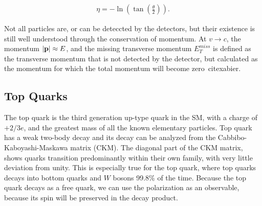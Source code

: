 \documentclass[12pt,a4paper]{article}
\numberwithin{equation}{section}
\begin{document}
\begin{align}
\label{eq:pseudorapidity}
\eta = -\ln({\tan\left(\frac{\theta}{2}\right)}).
\end{align}

Not all particles are, or can be deteccted by the detectors, but their existence
is still well understood through the conservation of momentum. At $v \rightarrow c$, the
momentum $\abs{\vb p} \approx E$, and the missing transverse momentum $E_T^{miss}$ is
defined as the transverse momentum that is not detected by the detector, but
calculated as the momentum for which the total momentum will become
zero~cite{xabier}.

\subsection{Top Quarks}
The top quark is the third generation up-type quark in the SM, with a charge of
$+2/3 e$, and the greatest mass of all the known elementary particles. Top quark
has a weak two-body decay and its decay can be analyzed from the
Cabbibo-Kaboyashi-Maskawa matrix (CKM). The diagonal part of the CKM matrix,
shows quarks transition predominantly within their own family, with very little
deviation from unity. This is especially true for the top quark, where top
quarks decays into bottom quarks and $W$ bosons 99.8\% of the time. Because the
top quark decays as a free quark, we can use the polarization as an observable,
because its spin will be preserved in the decay product.\\
\end{document}
